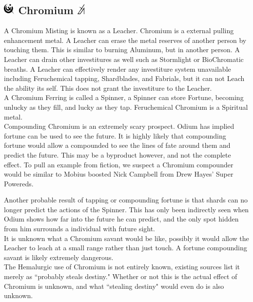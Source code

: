 \documentclass[conference]{IEEEtran}
\begin{document}
\subsection*{\includegraphics[height=1em]{images/Chromium.png}  Chromium \includegraphics[height=1em]{images/Chromium_(Feruchemy).png}}
A Chromium Misting is known as a Leacher.  Chromium is a external pulling enhancement metal. A Leacher can erase the metal reserves of another person by touching them.  This is similar to burning Aluminum, but in another person.  A Leacher can drain other investitures as well such as Stormlight or BioChromatic breaths.  A Leacher can effectively render any investiture system unavailable including Feruchemical tapping, Shardblades, and Fabrials, but it can not Leach the ability its self.  This does not grant the investiture to the Leacher.\\

A Chromium Ferring is called a Spinner, a Spinner can store Fortune, becoming unlucky as they fill, and lucky as they tap.  Feruchemical Chromium is a Spiritual metal.\\

Compounding Chromium is an extremely scary prospect.  Odium has implied fortune can be used to see the future.  It is highly likely that compounding fortune would allow a compounded to see the lines of fate around them and predict the future.  This may be a byproduct however, and not the complete effect.  To pull an example from fiction, we suspect a Chromium compounder would be similar to Mobius boosted Nick Campbell from Drew Hayes' Super Powereds.

Another probable result of tapping or compounding fortune is that shards can no longer predict the actions of the Spinner.  This has only been indirectly seen when Odium shows how far into the future he can predict, and the only spot hidden from him surrounds a individual with future sight.\\

It is unknown what a Chromium savant would be like, possibly it would allow the Leacher to leach at a small range rather than just touch. A fortune compounding savant is likely extremely dangerous.\\

The Hemalurgic use of Chromium is not entirely known, existing sources list it merely as ``probably steals destiny."  Whether or not this is the actual effect of Chromium is unknown, and what ``stealing destiny" would even do is also unknown.  \\
\end{document}
